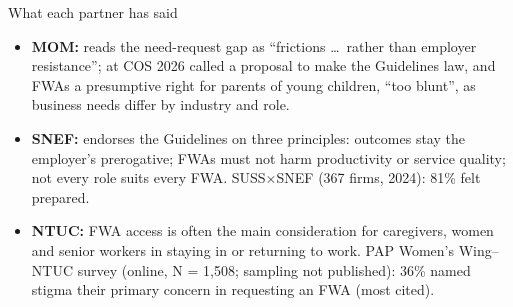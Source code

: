 \begin{frame}[t,label=B-partners]{What each partner has said}
  \FrameTop
  \begin{itemize}\setlength{\itemsep}{0.10cm}
    \item \textbf{MOM:} reads the need-request gap as ``frictions \ldots\ rather than employer resistance''; at COS 2026 called a proposal to make the Guidelines law, and FWAs a presumptive right for parents of young children, ``too blunt'', as business needs differ by industry and role.
    \item \textbf{SNEF:} endorses the Guidelines on three principles: outcomes stay the employer's prerogative; FWAs must not harm productivity or service quality; not every role suits every FWA. SUSS$\times$SNEF (367 firms, 2024): 81\% felt prepared.
    \item \textbf{NTUC:} FWA access is often the main consideration for caregivers, women and senior workers in staying in or returning to work. PAP Women's Wing--NTUC survey (online, N = 1,508; sampling not published): 36\% named stigma their primary concern in requesting an FWA (most cited).
  \end{itemize}
\end{frame}

